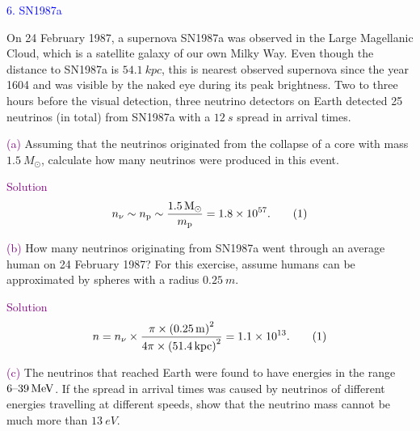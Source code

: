 \documentclass[UTF8, 12pt, a4paper, oneside, twocolumn, fontset=none]{ctexart}
\begin{document}
\hspace*{\fill}

\noindent\textcolor{blue}{6. SN1987a}

\noindent On 24 February 1987, a supernova SN1987a was observed in the Large Magellanic Cloud, which is a satellite galaxy of our own Milky Way. Even though the distance to SN1987a is $\qty{54.1}{kpc}$, this is nearest observed supernova since the year 1604 and was visible by the naked eye during its peak brightness. Two to three hours before the visual detection, three neutrino detectors on Earth detected 25 neutrinos (in total) from SN1987a with a $\qty{12}{s}$ spread in arrival times.

\hspace*{\fill}

\noindent\textcolor{purple}{(a)} Assuming that the neutrinos originated from the collapse of a core with mass $\qty{1.5}{M_{\odot}}$, calculate how many neutrinos were produced in this event.

\hspace*{\fill}

\noindent\textcolor{purple}{Solution}
\begin{equation}
n_{\nu}\sim n_{\ce{p}}\sim\frac{\qty{1.5}{M_{\odot}}}{m_{\ce{p}}}=\qty{1.8e57}{}.\tag{1}
\end{equation}

\hspace*{\fill}

\noindent\textcolor{purple}{(b)} How many neutrinos originating from SN1987a went through an average human on 24 February 1987? For this exercise, assume humans can be approximated by spheres with a radius $\qty{0.25}{m}$.

\hspace*{\fill}

\noindent\textcolor{purple}{Solution}
\begin{equation}
n=n_{\nu}\times\frac{\pi\times\mleft(\qty{0.25}{m}\mright)^{2}}{4\pi\times\mleft(\qty{51.4}{kpc}\mright)^{2}}=\qty{1.1e13}{}.\tag{1}
\end{equation}

\hspace*{\fill}

\noindent\textcolor{purple}{(c)} The neutrinos that reached Earth were found to have energies in the range $6\text{\textendash}\qty{39}{MeV}$. If the spread in arrival times was caused by neutrinos of different energies travelling at different speeds, show that the neutrino mass cannot be much more than $\qty{13}{eV}$.
\end{document}
